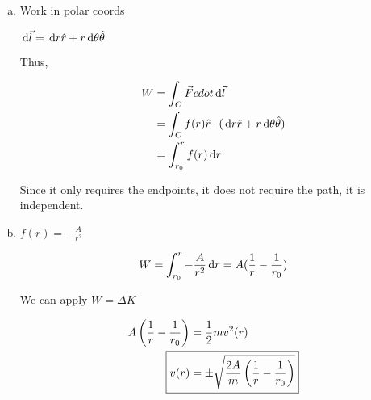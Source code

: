 \begin{sol}
	\begin{enumerate}[(a)]
		\item Work in polar coords
		
		$\D \vec l = \D r \hat r + r \D \theta \hat \theta$

		Thus, 

		\begin{align}
			W &= \int_C \vec F cdot \D \vec l\\
			&= \int_C f(r) \hat r \cdot (\D r \hat r + r \D \theta \hat \theta)\\
			&= \int_{r_0}^r f(r) \D r
		\end{align}

		Since it only requires the endpoints, it does not require the path, it is independent.

		\item $f(r) = -\frac{A}{r^2}$
		
		\begin{equation}
			W = \int_{r_0}^r -\frac{A}{r^2} \D r = A(\frac{1}{r} - \frac{1}{r_0})
		\end{equation}

		We can apply $W = \Delta K$

		\begin{align}
			A\left(\frac{1}{r} - \frac{1}{r_0}\right) &= \frac{1}{2}mv^2(r)\\
			\Aboxed{v(r) &= \pm \sqrt{\frac{2A}{m}\left(\frac{1}{r} - \frac{1}{r_0}\right)}}
		\end{align}
	\end{enumerate}
\end{sol}

